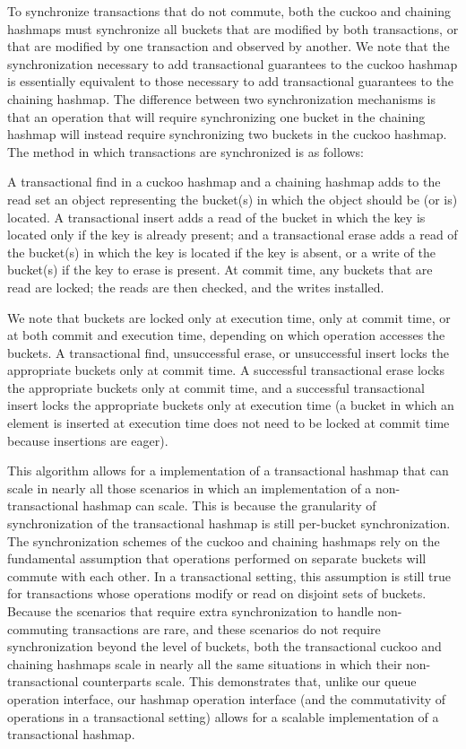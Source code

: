 To synchronize transactions that do not commute, both the cuckoo and chaining hashmaps must synchronize all buckets that are modified by both transactions, or that are modified by one transaction and observed by another. We note that the synchronization necessary to add transactional guarantees to the cuckoo hashmap is essentially equivalent to those necessary to add transactional guarantees to the chaining hashmap. The difference between two synchronization mechanisms is that an operation that will require synchronizing one bucket in the chaining hashmap will instead require synchronizing two buckets in the cuckoo hashmap. The method in which transactions are synchronized is as follows:

A transactional find in a cuckoo hashmap and a chaining hashmap adds to the read set an object representing the bucket(s) in which the object should be (or is) located. A transactional insert adds a read of the bucket in which the key is located only if the key is already present; and a transactional erase adds a read of the bucket(s) in which the key is located if the key is absent, or a write of the bucket(s) if the key to erase is present. At commit time, any buckets that are read are locked; the reads are then checked, and the writes installed.

We note that buckets are locked only at execution time, only at commit time, or at both commit and execution time, depending on which operation accesses the buckets. A transactional find, unsuccessful erase, or unsuccessful insert locks the appropriate buckets only at commit time. A successful transactional erase locks the appropriate buckets only at commit time, and a successful transactional insert locks the appropriate buckets only at execution time (a bucket in which an element is inserted at execution time does not need to be locked at commit time because insertions are eager).

This algorithm allows for a implementation of a transactional hashmap that can scale in nearly all those scenarios in which an implementation of a non-transactional hashmap can scale. This is because the granularity of synchronization of the transactional hashmap is still per-bucket synchronization. 
The synchronization schemes of the cuckoo and chaining hashmaps rely on the fundamental assumption that operations performed on separate buckets will commute with each other. In a transactional setting, this assumption is still true for transactions whose operations modify or read on disjoint sets of buckets. Because the scenarios that require extra synchronization to handle non-commuting transactions are rare, and these scenarios do not require synchronization beyond the level of buckets, both the transactional cuckoo and chaining hashmaps scale in nearly all the same situations in which their non-transactional counterparts scale. 
This demonstrates that, unlike our queue operation interface, our hashmap operation interface (and the commutativity of operations in a transactional setting) allows for a scalable implementation of a transactional hashmap.

